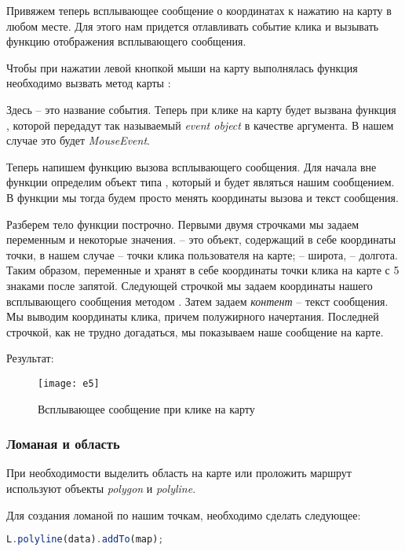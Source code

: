 Привяжем теперь всплывающее сообщение о координатах к нажатию на карту в 
любом месте. Для этого нам придется отлавливать событие клика и вызывать 
функцию отображения всплывающего сообщения.

Чтобы при нажатии левой кнопкой мыши на карту выполнялась функция 
 необходимо вызвать метод  карты :


Здесь  -- это название события. Теперь при клике на карту будет 
вызвана функция , которой передадут так называемый 
\emph{event object} в качестве аргумента. В нашем случае это будет 
\emph{MouseEvent}.

Теперь напишем функцию вызова всплывающего сообщения. Для начала вне функции 
определим объект типа , который и будет являться нашим 
сообщением. В функции  мы тогда будем просто менять координаты 
вызова и текст сообщения.



Разберем тело функции построчно. Первыми двумя строчками мы задаем 
переменным  и  некоторые значения.  -- это 
объект, содержащий в себе координаты точки, в нашем случае -- точки клика 
пользователя на карте;  -- широта,  -- 
долгота. Таким образом, переменные  и  хранят в себе 
координаты точки клика на карте с 5 знаками после запятой. Следующей строчкой 
мы задаем координаты нашего всплывающего сообщения методом . 
Затем задаем \emph{контент} -- текст сообщения. Мы выводим координаты клика, 
причем полужирного начертания. Последней строчкой, как не трудно догадаться, 
мы показываем наше сообщение на карте.

Результат:
\begin{figure}[ht!]
    \center
    \texttt{[image: e5]}
    \caption{Всплывающее сообщение при клике на карту}
    \label{pic:e5}
\end{figure}

\subsubsection{Ломаная и область}
При необходимости выделить область на карте или проложить маршрут используют 
объекты \emph{polygon} и \emph{polyline}.

Для создания ломаной по нашим точкам, необходимо сделать следующее:
\begin{lstlisting}[language=js]
    L.polyline(data).addTo(map);
\end{lstlisting}

